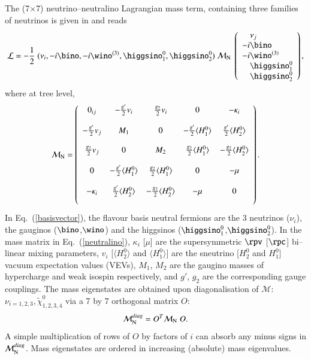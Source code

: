 \documentclass[pdflatex,final,3p,times]{elsarticle}
\begin{document}
The  (7$\times$7) neutrino--neutralino Lagrangian mass term, containing
three families of neutrinos is given in \cite{Allanach:2003eb} and reads
\begin{eqnarray}
{\cal L}= -\frac{1}{2} \; (\nu_i, -i \bino, -i \wino^{(3)}, \higgsino_1^0, \higgsino_2^0
)
\; {\cal M}_{\rm N} \; \left ( \begin{array}{r@{}l}
&\nu_j \\ -i&\bino \\  -i&\wino^{(3)} \\ &\higgsino_1^0 \\
&\higgsino_2^0 \end{array} \right ), \label{basisvector}
\end{eqnarray}
where at tree level,
\begin{eqnarray}
{\cal M}_{\rm N} = \left ( \begin{array}{ccccc}
 0_{ij}& -\frac{g'}{2} v_i   &  \frac{g_2}{2} v_i   &  0   & - \kappa_i \\[4mm]
 -\frac{g'}{2} v_j    &   M_1   &   0  &  -\frac{g'}{2} \langle H_1^0 \rangle   &  \frac{g'}{2} \langle H_2^0 \rangle \\[4mm]
  \frac{g_2}{2} v_j   &   0  &   M_2   &  \frac{g_2}{2} \langle H_1^0 \rangle   &  -\frac{g_2}{2} \langle H_2^0 \rangle\\[4mm]
 0    &   -\frac{g'}{2} \langle H_1^0 \rangle  &  \frac{g_2}{2} \langle H_1^0 \rangle    &   0  & -\mu \\[4mm]
 - \kappa_i    &  \frac{g'}{2} \langle H_2^0 \rangle   &  -\frac{g_2}{2} \langle H_2^0 \rangle   & -\mu    & 0 \\[4mm]
\end{array} \right ).\label{neutralino}
\end{eqnarray}
In Eq.~(\ref{basisvector}), the flavour basis neutral fermions are the
3 neutrinos ($\nu_i$), the gauginos ($\bino$,$\wino$) and the
higgsinos ($\higgsino_1^0$,$\higgsino_2^0$).  In the mass matrix in
Eq.~(\ref{neutralino}), $\kappa_i$ [$\mu$] are the supersymmetric
$\rpv$ [$\rpc$] bi--linear mixing parameters, $v_i$ [$\langle H_2^0 \rangle$ and $\langle H_1^0 \rangle$]
are the sneutrino [$H^0_2$ and $H^0_1$] vacuum expectation values
(VEVs), $M_1$, $M_2$ are the gaugino masses of hypercharge and weak
isospin respectively, and $g'$, $g_2$ are the corresponding gauge
couplings.  The mass eigenstates are obtained upon diagonalisation of
${\mathcal M}$: $\nu_{i=1,2,3},\tilde{\chi}^0_{1,2,3,4}$ via a 7 by 7
orthogonal matrix $O$:
\begin{equation}
{\mathcal M}_{\rm N}^{diag} = O^T {\mathcal M}_{\rm N} \; O. \label{Nmix}
\end{equation}
A simple multiplication of rows of $O$ by factors of $i$ can absorb
any minus signs in ${\mathcal M}_{\rm N}^{diag}$.  
Mass eigenstates are ordered in increasing (absolute) mass
eigenvalues.
\end{document}
